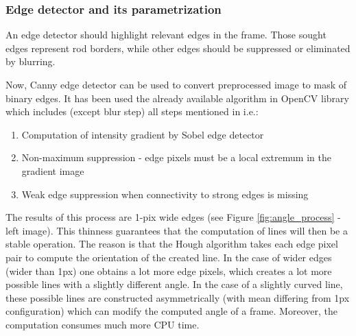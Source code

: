 \documentclass[preprint,12pt]{elsarticle}
\begin{document}
\subsubsection{Edge detector and its parametrization}

An edge detector should highlight relevant edges in the frame. Those sought edges represent rod borders, while other edges should be suppressed or eliminated by blurring.

Now, Canny edge detector \cite{Canny1986} can be used to convert preprocessed image to mask of binary edges. It has been used the already available algorithm in OpenCV library \cite{OpenCVCanny} which includes (except blur step) all steps mentioned in \cite{Canny1986} i.e.:
\begin{enumerate}
    \item Computation of intensity gradient by Sobel edge detector \cite{Sobel1968}
    \item Non-maximum suppression - edge pixels must be a local extremum in the gradient image
    \item Weak edge suppression when connectivity to strong edges is missing
\end{enumerate}
The results of this process are 1-pix wide edges (see Figure \ref{fig:angle_process} - left image). This thinness guarantees that the computation of lines will then be a stable operation. The reason is that the Hough algorithm takes each edge pixel pair to compute the orientation of the created line. In the case of wider edges (wider than 1px) one obtains a lot more edge pixels, which creates a lot more possible lines with a slightly different angle. In the case of a slightly curved line, these possible lines are constructed asymmetrically (with mean differing from 1px configuration) which can modify the computed angle of a frame. Moreover, the computation consumes much more CPU time.
\end{document}
